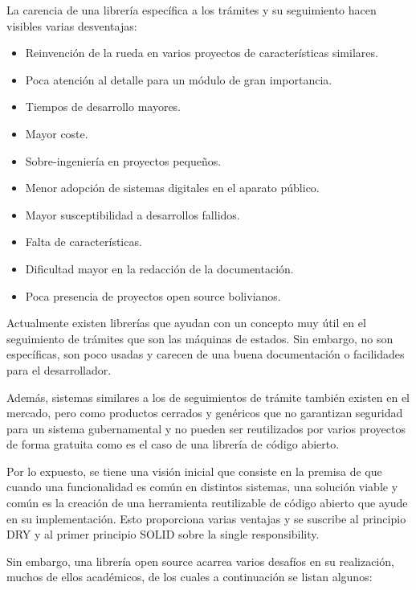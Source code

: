 La carencia de una librería específica a los trámites y su seguimiento hacen visibles varias desventajas:

\begin{itemize}
    \item Reinvención de la rueda en varios proyectos de características similares.
    \item Poca atención al detalle para un módulo de gran importancia.
    \item Tiempos de desarrollo mayores.
    \item Mayor coste.
    \item Sobre-ingeniería en proyectos pequeños.
    \item Menor adopción de sistemas digitales en el aparato público.
    \item Mayor susceptibilidad a desarrollos fallidos.
    \item Falta de características.
    \item Dificultad mayor en la redacción de la documentación.
    \item Poca presencia de proyectos open source bolivianos.
\end{itemize}

Actualmente existen librerías que ayudan con un concepto muy útil en el seguimiento de trámites que son las máquinas de estados. Sin embargo, no son específicas, son poco usadas y carecen de una buena documentación o facilidades para el desarrollador.

Además, sistemas similares a los de seguimientos de trámite también existen en el mercado, pero como productos cerrados y genéricos que no garantizan seguridad para un sistema gubernamental y no pueden ser reutilizados por varios proyectos de forma gratuita como es el caso de una librería de código abierto.

Por lo expuesto, se tiene una visión inicial que consiste en la premisa de que cuando una funcionalidad es común en distintos sistemas, una solución viable y común es la creación de una herramienta reutilizable de código abierto que ayude en su implementación. Esto proporciona varias ventajas y se suscribe al principio DRY  y al primer principio SOLID sobre la single responsibility.

Sin embargo, una librería open source acarrea varios desafíos en su realización, muchos de ellos académicos, de los cuales a continuación se listan algunos:

